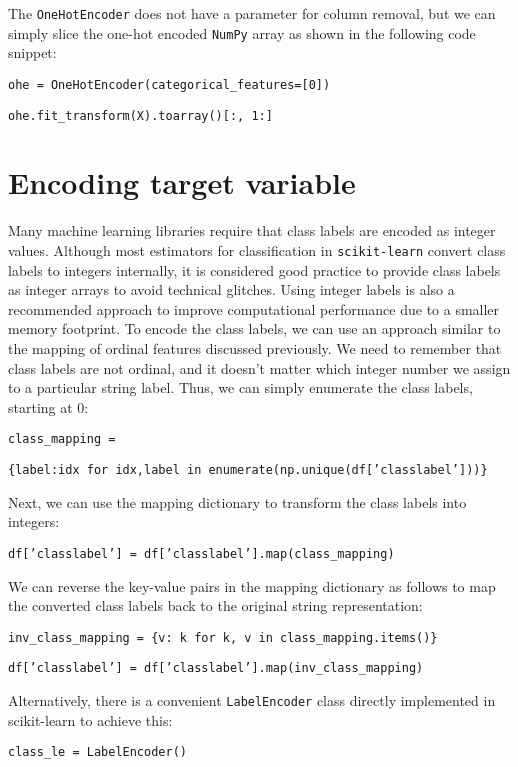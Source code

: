 \documentclass[11pt]{article}
\begin{document}
    The \texttt{OneHotEncoder} does not have a parameter for column removal, but we can simply slice the one-hot encoded \texttt{NumPy} array as shown in the following code snippet:

    \texttt{ohe = OneHotEncoder(categorical\_features=[0])}

    \texttt{ohe.fit\_transform(X).toarray()[:, 1:]}

    \section{Encoding target variable} \label{sec:encoding_target}

    Many machine learning libraries require that class labels are encoded as integer values.
    Although most estimators for classification in \texttt{scikit-learn} convert class labels to integers internally, it is considered good practice to provide class labels as integer arrays to avoid technical glitches.
    Using integer labels is also a recommended approach to improve computational performance due to a smaller memory footprint.
    To encode the class labels, we can use an approach similar to the mapping of ordinal features discussed previously.
    We need to remember that class labels are not ordinal, and it doesn't matter which integer number we assign to a particular string label.
    Thus, we can simply enumerate the class labels, starting at 0:

    \texttt{class\_mapping = }

    \texttt{\quad \{label:idx for idx,label in enumerate(np.unique(df['classlabel']))\}}

    Next, we can use the mapping dictionary to transform the class labels into integers:

    \texttt{df['classlabel'] = df['classlabel'].map(class\_mapping)}

    We can reverse the key-value pairs in the mapping dictionary as follows to map the converted class labels back to the original string representation:

    \texttt{inv\_class\_mapping = \{v: k for k, v in class\_mapping.items()\}}

    \texttt{df['classlabel'] = df['classlabel'].map(inv\_class\_mapping)}

    Alternatively, there is a convenient \texttt{LabelEncoder} class directly implemented in scikit-learn to achieve this:

    \texttt{class\_le = LabelEncoder()}
\end{document}
